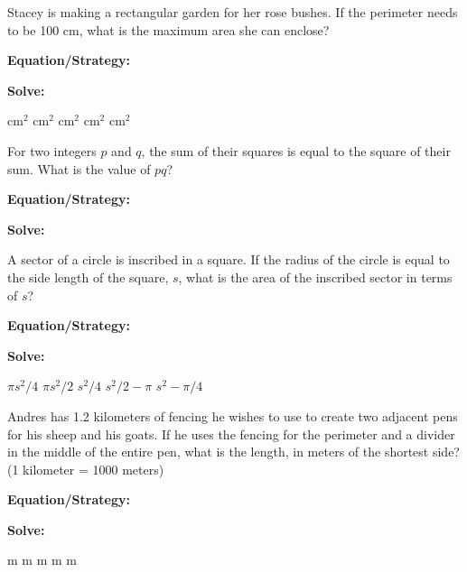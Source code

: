 \vfill
\newpage
\begin{multicols*}{2}
\begin{outline}[enumerate]
\medium

\1 Stacey is making a rectangular garden for her rose bushes. If the perimeter needs to be 100 cm, what is the maximum area she can enclose?

\bigskip
\textbf{Equation/Strategy:} \hrulefill

\bigskip
\textbf{Solve:}

\vfill
{} cm$^2$
 cm$^2$
 cm$^2$
 cm$^2$
 cm$^2$

\midline

\1 For two integers $p$ and $q$, the sum of their squares is equal to the square of their sum. What is the value of $pq$?

\bigskip
\textbf{Equation/Strategy:} \hrulefill

\bigskip
\textbf{Solve:}

\vfill
{}

\columnbreak
\advanced

\1 A sector of a circle is inscribed in a square. If the radius of the circle is equal to the side length of the square, $s$, what is the area of the inscribed sector in terms of $s$?

\bigskip
\textbf{Equation/Strategy:} \hrulefill

\bigskip
\textbf{Solve:}

\vfill
\2 $\pi s^2/4$
\2 $\pi s^2/2$
\2 $s^2/4$
\2 $s^2/2-\pi$
\2 $s^2-\pi/4$

\midline

\1 Andres has 1.2 kilometers of fencing he wishes to use to create two adjacent pens for his sheep and his goats. If he uses the fencing for the perimeter and a divider in the middle of the entire pen, what is the length, in meters of the shortest side? (1 kilometer = 1000 meters)

\bigskip
\textbf{Equation/Strategy:} \hrulefill

\bigskip
\textbf{Solve:}

\vfill
{} m
 m
 m
 m
 m
\end{outline}
\end{multicols*}